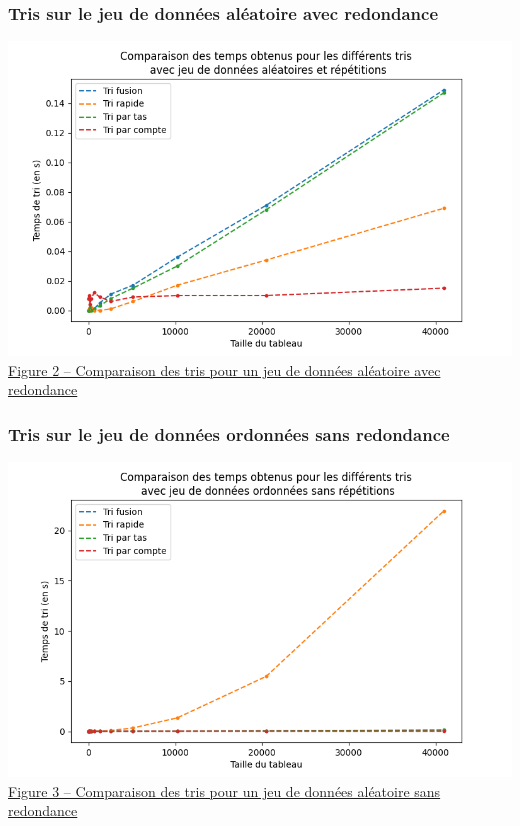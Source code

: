\documentclass[11pt,a4paper]{article}
\begin{document}
\subsubsection{Tris sur le jeu de données aléatoire avec redondance}
\includegraphics[scale = 0.5]{Images/Courbes img/aléatoire avec rep/aléatoires avec répétitions.png}\\
\underline {Figure 2 – Comparaison des tris pour un jeu de données aléatoire avec redondance}

\subsubsection{Tris sur le jeu de données ordonnées sans redondance}
\includegraphics[scale = 0.5]{Images/Courbes img/trié sans rep/ordonnées sans répétitions.png}\\
\underline {Figure 3 – Comparaison des tris pour un jeu de données aléatoire sans redondance}
\end{document}
